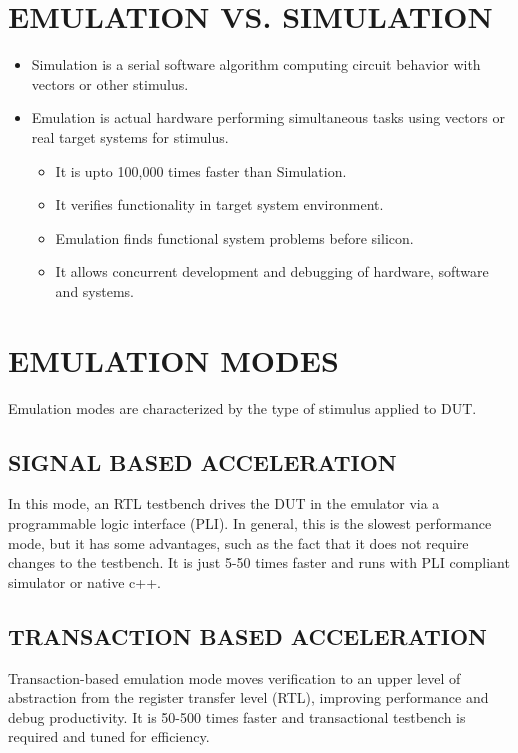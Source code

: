 \section{EMULATION VS. SIMULATION}
\begin{itemize}

\item[\ding{51}] Simulation is a serial software algorithm computing circuit behavior with vectors or other stimulus.

\item[\ding{51}] Emulation is actual hardware performing simultaneous tasks using vectors or real target systems for stimulus.
  \begin{itemize}
    
  \item It is upto 100,000 times faster than Simulation.

  \item It verifies functionality in target system environment.
  \item Emulation finds functional system problems before silicon.
  \item It allows concurrent development and debugging of hardware, software and systems.
    \end{itemize}
  
\end{itemize}

\section{EMULATION MODES}
Emulation modes are characterized by the type of stimulus applied to DUT.
\subsection{SIGNAL BASED ACCELERATION}
In this mode, an RTL testbench drives the DUT in the emulator via a programmable logic interface (PLI). In general, this is the slowest performance mode, but it has some advantages, such as the fact that it does not require changes to the testbench. It is just 5-50 times faster and runs with PLI compliant simulator or native c++.
\subsection{TRANSACTION BASED ACCELERATION}
Transaction-based emulation mode moves verification to an upper  level of abstraction from the register transfer level (RTL), improving performance and debug productivity. It is 50-500 times faster and transactional testbench is required and tuned for efficiency.

